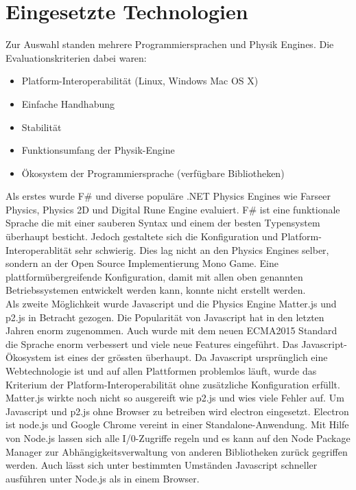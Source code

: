   \section{Eingesetzte Technologien\label{sec:Technology}}

    Zur Auswahl standen mehrere Programmiersprachen und Physik Engines.
    Die Evaluationskriterien dabei waren:
    \begin{itemize}
      \item Platform-Interoperabilität (Linux, Windows Mac OS X)
      \item Einfache Handhabung
      \item Stabilität
      \item Funktionsumfang der Physik-Engine
      \item Ökosystem der Programmiersprache (verfügbare Bibliotheken)
    \end{itemize}

    Als erstes wurde F\# und diverse populäre .NET Physics Engines wie Farseer Physics,
    Physics 2D und Digital Rune Engine evaluiert.
    F\# ist eine funktionale Sprache die mit einer sauberen Syntax und einem der besten Typensystem überhaupt besticht.
    Jedoch gestaltete sich die Konfiguration und Platform-Interoperablität sehr schwierig.
    Dies lag nicht an den Physics Engines selber, sondern an der Open Source Implementierung Mono Game.
    Eine plattformübergreifende Konfiguration,
    damit mit allen oben genannten Betriebssystemen entwickelt werden kann,
    konnte nicht erstellt werden.
    \\
    Als zweite Möglichkeit wurde Javascript und die Physics Engine Matter.js und p2.js in Betracht gezogen.
    Die Popularität von Javascript hat in den letzten Jahren enorm zugenommen.
    Auch wurde mit dem neuen ECMA2015 Standard die Sprache enorm verbessert und viele neue Features eingeführt.
    Das Javascript-Ökosystem ist eines der grössten überhaupt.
    Da Javascript ursprünglich eine Webtechnologie ist und auf allen Plattformen problemlos läuft,
    wurde das Kriterium der Platform-Interoperabilität ohne zusätzliche Konfiguration erfüllt.
    Matter.js wirkte noch nicht so ausgereift wie p2.js und wies viele Fehler auf.
    Um Javascript und p2.js ohne Browser zu betreiben wird electron eingesetzt.
    Electron ist node.js und Google Chrome vereint in einer Standalone-Anwendung.
    Mit Hilfe von Node.js lassen sich alle I/0-Zugriffe regeln und es kann auf den
    Node Package Manager zur Abhängigkeitsverwaltung von anderen Bibliotheken zurück gegriffen werden.
    Auch lässt sich unter bestimmten Umständen Javascript schneller ausführen unter Node.js als in einem Browser.


